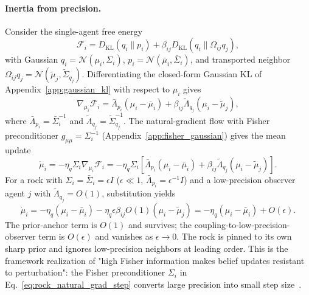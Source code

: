 \documentclass[11pt]{article}
\begin{document}
\paragraph{Inertia from precision.} Consider the single-agent free energy
\begin{equation}
\mathcal{F}_i = D_{\mathrm{KL}}(q_i \| p_i) + \beta_{ij} D_{\mathrm{KL}}(q_i \| \Omega_{ij} q_j),
\end{equation}
with Gaussian $q_i = \mathcal{N}(\mu_i, \Sigma_i)$, $p_i = \mathcal{N}(\bar{\mu}_i, \bar{\Sigma}_i)$, and transported neighbor $\Omega_{ij} q_j = \mathcal{N}(\tilde{\mu}_j, \tilde{\Sigma}_{q_j})$. Differentiating the closed-form Gaussian KL of Appendix~\ref{app:gaussian_kl} with respect to $\mu_i$ gives
\begin{equation}
\nabla_{\mu_i}\mathcal{F}_i = \bar{\Lambda}_{p_i}(\mu_i - \bar{\mu}_i) + \beta_{ij}\tilde{\Lambda}_{q_j}(\mu_i - \tilde{\mu}_j),
\label{eq:rock_grad_mu}
\end{equation}
where $\bar{\Lambda}_{p_i} = \bar{\Sigma}_i^{-1}$ and $\tilde{\Lambda}_{q_j} = \tilde{\Sigma}_{q_j}^{-1}$. The natural-gradient flow with Fisher preconditioner $g_{\mu\mu} = \Sigma_i^{-1}$ (Appendix~\ref{app:fisher_gaussian}) gives the mean update
\begin{equation}
\dot{\mu}_i = -\eta_q \Sigma_i \nabla_{\mu_i}\mathcal{F}_i = -\eta_q\Sigma_i\left[\bar{\Lambda}_{p_i}(\mu_i - \bar{\mu}_i) + \beta_{ij}\tilde{\Lambda}_{q_j}(\mu_i - \tilde{\mu}_j)\right].
\label{eq:rock_natural_grad_step}
\end{equation}
For a rock with $\Sigma_i = \bar{\Sigma}_i = \epsilon I$ ($\epsilon \ll 1$, $\bar{\Lambda}_{p_i} = \epsilon^{-1} I$) and a low-precision observer agent $j$ with $\tilde{\Lambda}_{q_j} = O(1)$, substitution yields
\begin{equation}
\dot{\mu}_i = -\eta_q(\mu_i - \bar{\mu}_i) - \eta_q \epsilon \beta_{ij} O(1) (\mu_i - \tilde{\mu}_j) = -\eta_q(\mu_i - \bar{\mu}_i) + O(\epsilon).
\label{eq:rock_inertia}
\end{equation}
The prior-anchor term is $O(1)$ and survives; the coupling-to-low-precision-observer term is $O(\epsilon)$ and vanishes as $\epsilon \to 0$. The rock is pinned to its own sharp prior and ignores low-precision neighbors at leading order. This is the framework realization of "high Fisher information makes belief updates resistant to perturbation": the Fisher preconditioner $\Sigma_i$ in Eq.~\eqref{eq:rock_natural_grad_step} converts large precision into small step size~\cite{Amari2016}.
\end{document}
